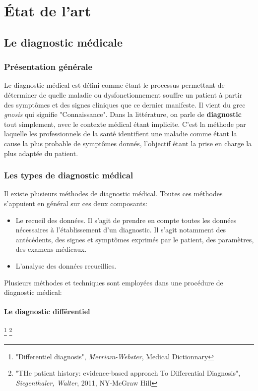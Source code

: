 
\chapter{État de l'art}
\label{chp:etat_art}


\section{Le diagnostic médicale}

\subsection{Présentation générale}
Le diagnostic médical est défini comme étant le processus permettant de déterminer de quelle maladie ou dysfonctionnement souffre un patient à partir des symptômes et des signes cliniques que ce dernier manifeste. Il vient du grec \textit{gnosis} qui signifie "Connaissance".
Dans la littérature, on parle de \textbf{diagnostic} tout simplement, avec le contexte médical étant implicite.
C'est la méthode par laquelle les professionnels de la santé identifient une maladie comme étant la cause la plus probable de symptômes donnés, l'objectif étant la prise en charge la plus adaptée du patient.


\subsection{Les types de diagnostic médical}
Il existe plusieurs méthodes de diagnostic médical. Toutes ces méthodes s'appuient en général sur ces deux composants:
\begin{itemize}
    \item Le recueil des données. Il s'agit de prendre en compte toutes les données nécessaires à l'établissement d'un diagnostic. Il s'agit notamment des antécédents, des signes et symptômes exprimés par le patient, des paramètres, des examens médicaux.
    \item L'analyse des données recueillies.
\end{itemize}

Plusieurs méthodes et techniques sont employées dans une procédure de diagnostic médical:

\subsubsection{Le diagnostic différentiel} \footnote{"Differentiel diagnosis", \textit{Merriam-Webster}, Medical Dictionnary} \footnote{"THe patient history: evidence-based approach To Differential Diagnosis", \textit{Siegenthaler, Walter}, 2011, NY-McGraw Hill}

